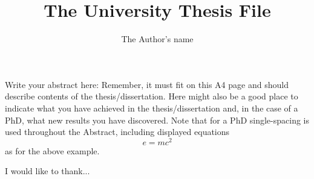 \documentclass[12pt,MSc,twoside]{muthesis}
\numberwithin{equation}{chapter}															%
\begin{document}
\title{The University Thesis File}
\author{The Author's name}
\def\wordcount{nnnnn}




\beforeabstract

Write your abstract here: Remember, it must fit on this A4 page and should
describe contents of the thesis/dissertation. Here might also be a good place
to indicate what you have achieved in the thesis/dissertation and, in the
case of a PhD, what new results you have discovered. Note that for a PhD
single-spacing is used throughout the Abstract, including displayed equations
\[
e = mc^{2}
\]
as for the above example.

\afterabstract

I would like to thank...

\afterpreface

\raggedright          																					%


 





\end{document}
